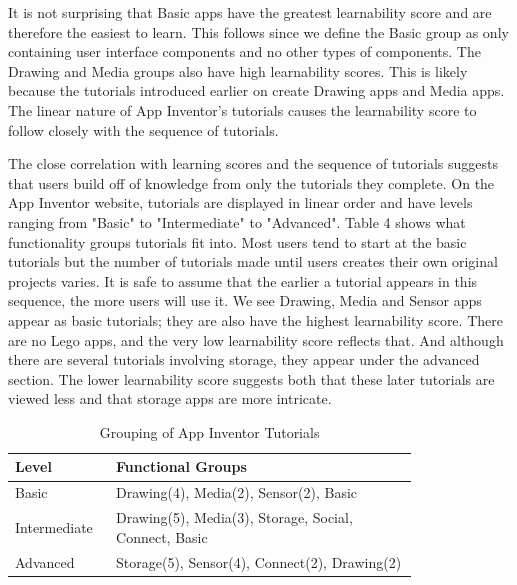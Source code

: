 \documentclass[conference]{IEEEtran}
\begin{document}
It is not surprising that Basic apps have the greatest learnability score and are therefore the easiest to learn. This follows since we define the Basic group as only containing user interface components and no other types of components. The Drawing and Media groups also have high learnability scores. This is likely because the tutorials introduced earlier on create Drawing apps and Media apps. The linear nature of App Inventor's tutorials causes the learnability score to follow closely with the sequence of tutorials.

The close correlation with learning scores and the sequence of tutorials suggests that users build off of knowledge from only the tutorials they complete. On the App Inventor website, tutorials are displayed in linear order and have levels ranging from "Basic" to "Intermediate" to "Advanced". Table 4 shows what functionality groups tutorials fit into. Most users tend to start at the basic tutorials but the number of tutorials made until users creates their own original projects varies. It is safe to assume that the earlier a tutorial appears in this sequence, the more users will use it. We see Drawing, Media and Sensor apps appear as basic tutorials; they are also have the highest learnability score. There are no Lego apps, and the very low learnability score reflects that. And although there are several tutorials involving storage, they appear under the advanced section. The lower learnability score suggests both that these later tutorials are viewed less and that storage apps are more intricate.

\begin{table}[h!]
\renewcommand{\arraystretch}{1.3}
\caption{Grouping of App Inventor Tutorials}
\label{table_tutorial_group}
\centering
\begin{tabular}{| p{0.15\linewidth} | p{0.65\linewidth} | }
\hline

Level&
Functional Groups\\
\hline \hline
Basic&
Drawing(4), Media(2), Sensor(2), Basic\\
\hline 
Intermediate&
Drawing(5), Media(3), Storage, Social, Connect, Basic\\
\hline
Advanced&
Storage(5), Sensor(4), Connect(2), Drawing(2)\\

\hline

\end{tabular}
\end{table}
\end{document}
